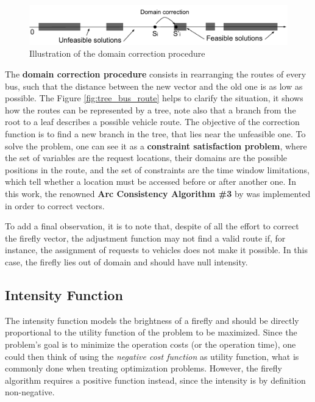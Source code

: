 \documentclass[tuberlin,cic,tc,openright,english,noabntcite,oneside]{iiufrgs}
\begin{document}
\begin{figure}[H]
	\centering
    \caption{Illustration of the domain correction procedure}
    \includegraphics[width=\textwidth]{fig_solution_domain}\par
    \label{fig:solution_domain}
\end{figure}

The \textbf{domain correction procedure} consists in rearranging the routes of every bus, such that the distance between the new vector and the old one is as low as possible. The Figure \ref{fig:tree_bus_route} helps to clarify the situation, it shows how the routes can be represented by a tree, note also that a branch from the root to a leaf describes a possible vehicle route. The objective of the correction function is to find a new branch in the tree, that lies near the unfeasible one. To solve the problem, one can see it as a \textbf{constraint satisfaction problem}, where the set of variables are the request locations, their domains are the possible positions in the route, and the set of constraints are the time window limitations, which tell whether a location must be accessed before or after another one. In this work, the renowned \textbf{Arc Consistency Algorithm \#3} by \textcite{mackworth_consistency_1977} was implemented in order to correct vectors.

To add a final observation, it is to note that, despite of all the effort to correct the firefly vector, the adjustment function may not find a valid route if, for instance, the assignment of requests to vehicles does not make it possible. In this case, the firefly lies out of domain and should have null intensity.

\subsection{Intensity Function}
The intensity function models the brightness of a firefly and should be directly proportional to the utility function of the problem to be maximized. Since the problem's goal is to minimize the operation costs (or the operation time), one could then think of using the \emph{negative cost function} as utility function, what is commonly done when treating optimization problems. However, the firefly algorithm requires a positive function instead, since the intensity is by definition non-negative.
\end{document}
